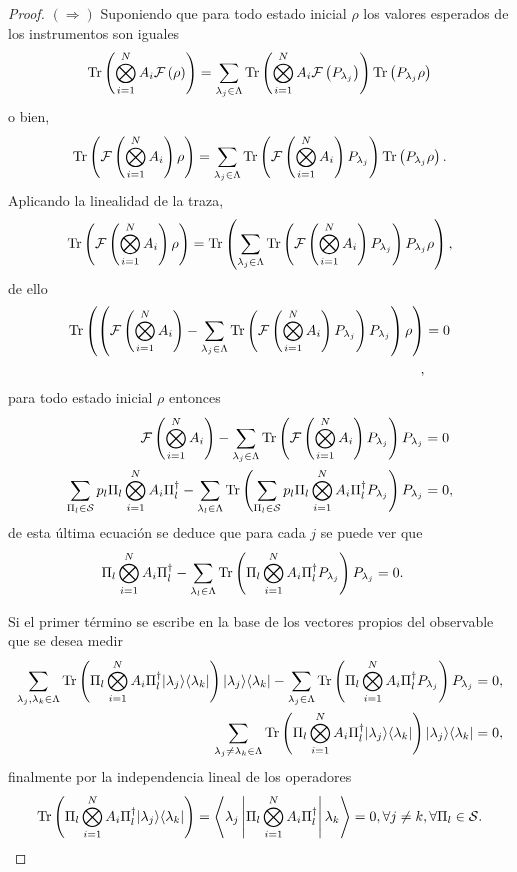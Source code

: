 \begin{proof}
    $(\Rightarrow)$ Suponiendo que para todo estado inicial $\rho$ los valores esperados de los instrumentos son iguales \[ {\rm Tr}\left( \bigotimes_{i=1}^{N} A_i \mathcal{F}\left(\rho\right)\right)=\sum_{\lambda_j\in \Lambda} {\rm Tr}\left(\bigotimes_{i=1}^{N} A_i\mathcal{F}\left(P_{\lambda_j}\right)\right) {\rm Tr}\left(P_{\lambda_j}\rho\right)\]
o bien, \[ {\rm Tr}\left( \mathcal{F}\left(\bigotimes_{i=1}^{N} A_i \right)\rho\right)=\sum_{\lambda_j\in \Lambda} {\rm Tr}\left(\mathcal{F}\left(\bigotimes_{i=1}^{N} A_i\right)P_{\lambda_j}\right) {\rm Tr}\left(P_{\lambda_j}\rho\right).\] Aplicando la linealidad de la traza, \[ {\rm Tr}\left( \mathcal{F}\left(\bigotimes_{i=1}^{N} A_i \right)\rho\right)={\rm Tr}\left(\sum_{\lambda_j\in \Lambda} {\rm Tr}\left(\mathcal{F}\left(\bigotimes_{i=1}^{N} A_i\right)P_{\lambda_j}\right) P_{\lambda_j}\rho\right),\]de ello  \[ \begin{split}{\rm Tr}\left( \left(\mathcal{F}\left(\bigotimes_{i=1}^{N} A_i \right)-\sum_{\lambda_j\in \Lambda} {\rm Tr}\left(\mathcal{F}\left(\bigotimes_{i=1}^{N} A_i\right)P_{\lambda_j}\right) P_{\lambda_j}\right)\rho\right)&=0\\,\end{split}\] para todo estado inicial $\rho$ entonces\[\begin{split}\mathcal{F}\left(\bigotimes_{i=1}^{N} A_i \right)-\sum_{\lambda_j\in \Lambda} {\rm Tr}\left(\mathcal{F}\left(\bigotimes_{i=1}^{N} A_i\right)P_{\lambda_j}\right) P_{\lambda_j}&=0\\
    \sum_{\Pi_l\in \mathcal{S}}p_l\Pi_{l}\bigotimes_{i=1}^{N} A_i \Pi_{l}^{\dagger}-\sum_{\lambda_l\in \Lambda} {\rm Tr}\left(\sum_{\Pi_l\in \mathcal{S}}p_l\Pi_{l}\bigotimes_{i=1}^{N} A_i\Pi_{l}^{\dagger}P_{\lambda_j}\right) P_{\lambda_j}&=0, 
\end{split}\] de esta última ecuación se deduce que para cada $j$ se puede ver que \[\begin{split}
    \Pi_{l}\bigotimes_{i=1}^{N} A_i \Pi_{l}^{\dagger}-\sum_{\lambda_l\in \Lambda} {\rm Tr}\left(\Pi_{l}\bigotimes_{i=1}^{N} A_i\Pi_{l}^{\dagger}P_{\lambda_j}\right) P_{\lambda_j}&=0.
\end{split}\] 

Si el primer término se escribe en la base de los vectores propios del observable que se desea medir  \[\begin{split}
    \sum_{\lambda_j, \lambda_k\in \Lambda} {\rm Tr}\left(\Pi_{l}\bigotimes_{i=1}^{N} A_i\Pi_{l}^{\dagger}|\lambda_j\rangle \langle \lambda_k|\right) |\lambda_j\rangle \langle\lambda_k|-\sum_{\lambda_j\in \Lambda} {\rm Tr}\left(\Pi_{l}\bigotimes_{i=1}^{N} A_i\Pi_{l}^{\dagger}P_{\lambda_j}\right) P_{\lambda_j}&=0,\\
    \sum_{\lambda_j\neq\lambda_k\in \Lambda} {\rm Tr}\left(\Pi_{l}\bigotimes_{i=1}^{N} A_i\Pi_{l}^{\dagger}|\lambda_j\rangle \langle \lambda_k|\right) |\lambda_j\rangle \langle\lambda_k|&=0,
\end{split}\] finalmente por la independencia lineal de los operadores\[ {\rm Tr}\left(\Pi_{l}\bigotimes_{i=1}^{N} A_i\Pi_{l}^{\dagger}|\lambda_j\rangle \langle \lambda_k|\right)= \left\langle\lambda_j\left|\Pi_{l}\bigotimes_{i=1}^{N} A_i\Pi_{l}^{\dagger}\right|\lambda_k\right\rangle=0, \forall j\neq k, \forall \Pi_l \in \mathcal{S}.\]



\end{proof}
